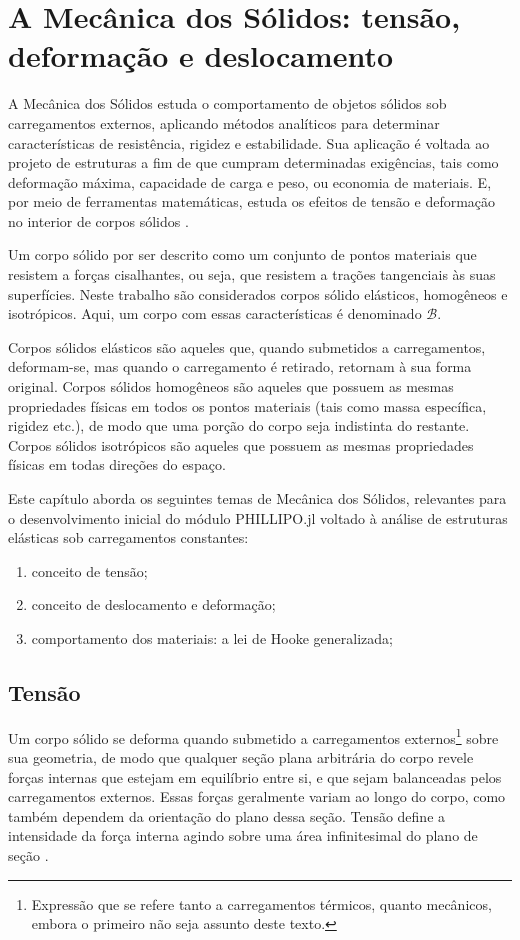 \chapter{A Mecânica dos Sólidos: tensão, deformação e deslocamento}

A Mecânica dos Sólidos estuda o comportamento de objetos sólidos sob carregamentos externos, aplicando métodos analíticos para determinar características de resistência, rigidez e estabilidade. Sua aplicação é voltada ao projeto de estruturas a fim de que cumpram determinadas exigências, tais como deformação máxima, capacidade de carga e peso, ou economia de materiais. E, por meio de ferramentas matemáticas, estuda os efeitos de tensão e deformação no interior de corpos sólidos \cite[pág. 2]{popov}.


Um corpo sólido por ser descrito como um conjunto de pontos materiais que resistem a forças cisalhantes, ou seja, que resistem a trações tangenciais às suas superfícies. Neste trabalho são considerados corpos sólido elásticos, homogêneos e isotrópicos. Aqui, um corpo com essas características é denominado $\mathcal{B}$.

Corpos sólidos elásticos são aqueles que, quando submetidos a carregamentos, deformam-se, mas quando o carregamento é retirado, retornam à sua forma original. Corpos sólidos homogêneos são aqueles que possuem as mesmas propriedades físicas em todos os pontos materiais (tais como massa específica, rigidez etc.), de modo que uma porção do corpo seja indistinta do restante. Corpos sólidos isotrópicos são aqueles que possuem as mesmas propriedades físicas em todas direções do espaço.

Este capítulo aborda os seguintes temas de Mecânica dos Sólidos, relevantes para o desenvolvimento inicial do módulo PHILLIPO.jl voltado à análise de estruturas elásticas sob carregamentos constantes:
\begin{enumerate}
    \item conceito de tensão;
    \item conceito de deslocamento e deformação;
    \item comportamento dos materiais: a lei de Hooke generalizada;
\end{enumerate}

\section{Tensão}

Um corpo sólido se deforma quando submetido a carregamentos externos\footnote{Expressão que se refere tanto a carregamentos térmicos, quanto mecânicos, embora o primeiro não seja assunto deste texto.} sobre sua geometria, de modo que qualquer seção plana arbitrária do corpo revele forças internas que estejam em equilíbrio entre si, e que sejam balanceadas pelos carregamentos externos. Essas forças geralmente variam ao longo do corpo, como também dependem da orientação do plano dessa seção. Tensão define a intensidade da força interna agindo sobre uma área infinitesimal do plano de seção \cite[págs. 4 e 5]{popov}.

